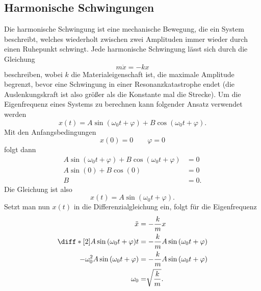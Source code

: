 \documentclass[a4paper,12pt]{article}
\numberwithin{equation}{section}
\begin{document}
\subsection{Harmonische Schwingungen}
Die harmonische Schwingung ist eine mechanische Bewegung, die ein System beschreibt, welches wiederholt zwischen zwei Amplituden immer wieder durch einen Ruhepunkt schwingt. Jede harmonische Schwingung lässt sich durch die Gleichung
\[ 
        m\ddot{x}=-kx
\] 
beschreiben, wobei $k$ die Materialeigenschaft ist, die maximale Amplitude begrenzt, bevor eine Schwingung in einer Resonanzkatastrophe endet (die Auslenkungskraft ist also größer als die Konstante mal die Strecke). Um die Eigenfrequenz eines Systems zu berechnen kann folgender Ansatz verwendet werden
\[ 
        x\left(t\right)=A\sin \left(\omega _0t+\varphi \right)+B\cos \left(\omega _0t+\varphi \right)
.\] 
Mit den Anfangsbedingungen
\[ 
        x\left(0\right)=0\qquad \varphi =0
\]
folgt dann
\begin{align*}
        A\sin \left(\omega _0t+\varphi \right)+B\cos \left(\omega _0t+\varphi \right)&=0\\
        A\sin \left(0\right)+B\cos \left(0\right)&=0\\
        B&=0
.\end{align*}
Die Gleichung ist also
\[ 
        x\left(t\right)=A\sin \left(\omega _0t+\varphi \right)
.\] 
Setzt man nun $x\left(t\right)$ in die Differenzialgleichung ein, folgt für die Eigenfrequenz
\begin{align*}
        \ddot{x}&=-\dfrac{k}{m}x\\
        \diff*[2]{A\sin \left(\omega _0t+\varphi \right)}{t}&=-\dfrac{k}{m}A\sin \left(\omega _0t+\varphi \right)\\
        -\omega _0^2A\sin \left(\omega _0t+\varphi \right)&=-\dfrac{k}{m}A\sin \left(\omega _0t+\varphi \right)\\
        \omega _0&=\sqrt[]{\dfrac{k}{m}}
.\end{align*}
\end{document}
